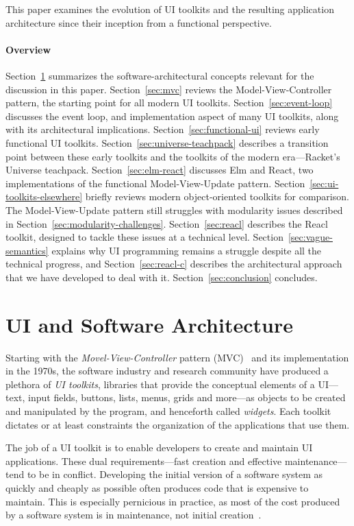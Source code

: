 \documentclass[sigplan,review,screen]{acmart}
\begin{document}
This paper examines the evolution of UI toolkits and the resulting
application architecture since their inception from a functional
perspective.

\paragraph{Overview} Section~\ref{sec:ui-and-architecture} summarizes
the software-architectural concepts relevant for the discussion in
this paper.  Section~\ref{sec:mvc} reviews the Model-View-Controller
pattern, the starting point for all modern UI toolkits.
Section~\ref{sec:event-loop} discusses the event loop, and
implementation aspect of many UI toolkits, along with its
architectural implications.  Section~\ref{sec:functional-ui} reviews
early functional UI toolkits.  Section~\ref{sec:universe-teachpack}
describes a transition point between these early toolkits and the
toolkits of the modern era---Racket's Universe teachpack.
Section~\ref{sec:elm-react} discusses Elm and React, two
implementations of the functional Model-View-Update pattern.
Section~\ref{sec:ui-toolkits-elsewhere} briefly reviews modern
object-oriented toolkits for comparison.  The Model-View-Update
pattern still struggles with modularity issues described in
Section~\ref{sec:modularity-challenges}.  Section~\ref{sec:reacl}
describes the Reacl toolkit, designed to tackle these issues at a
technical level.  Section~\ref{sec:vague-semantics} explains why UI
programming remains a struggle despite all the technical progress, and
Section~\ref{sec:reacl-c} describes the architectural approach that we
have developed to deal with it.  Section~\ref{sec:conclusion} concludes.


\section{UI and Software Architecture}
\label{sec:ui-and-architecture}

Starting with the \textit{Movel-View-Controller} pattern
(MVC)~\cite{MVC} and its implementation in the 1970s, the software
industry and research community have produced a plethora of \textit{UI
  toolkits}, libraries that provide the conceptual elements of a
UI---text, input fields, buttons, lists, menus, grids and more---as
objects to be created and manipulated by the program, and henceforth
called \textit{widgets}.  Each toolkit dictates or at least
constraints the organization of the applications that use them.

The job of a UI toolkit is to enable developers to create and maintain
UI applications.  These dual requirements---fast creation and
effective maintenance---tend to be in conflict.  Developing the initial version
of a software system as quickly and cheaply as possible often produces
code that is expensive to maintain.  This is especially pernicious in
practice, as most of the cost produced by a software system is in
maintenance, not initial creation~\cite{GreenBook}.
\end{document}
